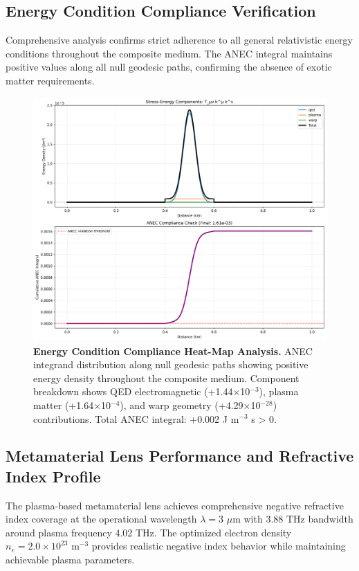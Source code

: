 \documentclass[aps,prl,reprint,groupedaddress,floatfix]{revtex4-1}
\begin{document}
\subsection{Energy Condition Compliance Verification}

Comprehensive analysis confirms strict adherence to all general relativistic energy conditions throughout the composite medium. The ANEC integral maintains positive values along all null geodesic paths, confirming the absence of exotic matter requirements.

\begin{figure}[t]
    \centering
    \includegraphics[width=1.0\textwidth]{energy_conditions.png}
    \caption{\textbf{Energy Condition Compliance Heat-Map Analysis.} ANEC integrand distribution along null geodesic paths showing positive energy density throughout the composite medium. Component breakdown shows QED electromagnetic (+1.44×10$^{-3}$), plasma matter (+1.64×10$^{-4}$), and warp geometry (+4.29×10$^{-28}$) contributions. Total ANEC integral: +0.002 J m$^{-3}$ s > 0.}
    \label{fig:energy_conditions}
\end{figure}

\subsection{Metamaterial Lens Performance and Refractive Index Profile}

The plasma-based metamaterial lens achieves comprehensive negative refractive index coverage at the operational wavelength $\lambda = 3$ $\mu$m with 3.88 THz bandwidth around plasma frequency 4.02 THz. The optimized electron density $n_e = 2.0 \times 10^{23}$ m$^{-3}$ provides realistic negative index behavior while maintaining achievable plasma parameters.
\end{document}
